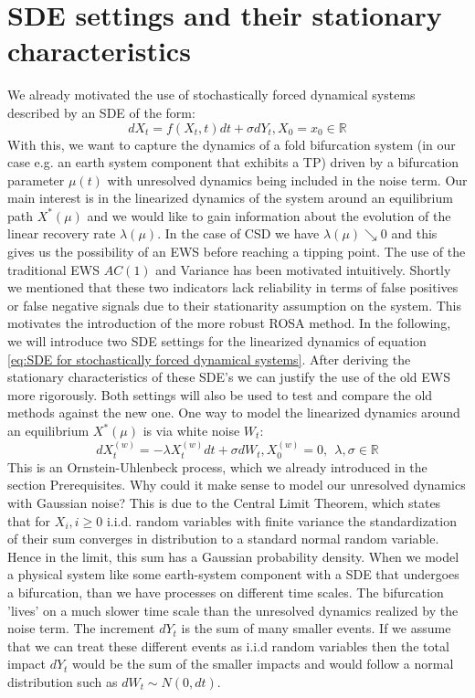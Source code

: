 \documentclass[%
thesis=student,%
coverpage=false,%
titlepage=false,%
headmarks=true, %
english,%
font=libertine, %
math=newpxtx, %
BCOR=5mm,%
coverBCOR=11mm%
]{tumbook}
\begin{document}
\chapter{SDE settings and their stationary characteristics}

We already motivated the use of stochastically forced dynamical systems described by an SDE of the form:
\begin{equation}
    dX_{t} = f(X_{t},t)dt + \sigma dY_{t}, X_{0} = x_{0} \in \mathbb{R}
    \label{eq:SDE for stochastically forced dynamical systems}
\end{equation}
With this, we want to capture the dynamics of a fold bifurcation system (in our case e.g. an earth system component that exhibits a TP) driven by a bifurcation parameter $\mu(t)$ with unresolved dynamics being included in the noise term. Our main interest is in the linearized dynamics of the system around an equilibrium path $X^{*}(\mu)$ and we would like to gain information about the evolution of the linear recovery rate $\lambda(\mu)$. In the case of CSD we have $\lambda(\mu) \searrow 0$ and this gives us the possibility of an EWS before reaching a tipping point. The use of the traditional EWS $AC(1)$ and Variance has been motivated intuitively. Shortly we mentioned that these two indicators lack reliability in terms of false positives or false negative signals due to their stationarity assumption on the system. This motivates the introduction of the more robust ROSA method. 
In the following, we will introduce two SDE settings for the linearized dynamics of equation \ref{eq:SDE for stochastically forced dynamical systems}. 
After deriving the stationary characteristics of these SDE's we can justify the use of the old EWS more rigorously. Both settings will also be used to test and compare the old methods against the new one.
One way to model the linearized dynamics around an equilibrium $X^{*}(\mu)$ is via white noise $W_{t}$:
\begin{equation}
        dX_{t}^{(w)} = -\lambda X_{t}^{(w)}dt + \sigma dW_{t}, X_{0}^{(w)} = 0, \ \ \lambda,\sigma \in \mathbb{R}
        \label{eq: white noise linearized SDE}
\end{equation}
This is an Ornstein-Uhlenbeck process, which we already introduced in the section Prerequisites. Why could it make sense to model our unresolved dynamics with Gaussian noise? This is due to the Central Limit Theorem, which states that for $X_{i}, i \geq 0$ i.i.d. random variables with finite variance the standardization of their sum converges in distribution to a standard normal random variable. Hence in the limit, this sum has a Gaussian probability density. When we model a physical system like some earth-system component with a SDE that undergoes a bifurcation, than we have processes on different time scales. The bifurcation 'lives' on a much slower time scale than the unresolved dynamics realized by the noise term. The increment $dY_{t}$ is the sum of many smaller events. If we assume that we can treat these different events as i.i.d random variables then the total impact $dY_{t}$ would be the sum of the smaller impacts and would follow a normal distribution such as $dW_{t} \sim N(0,dt)$. \cite{Kurt:2010} \\
\end{document}

